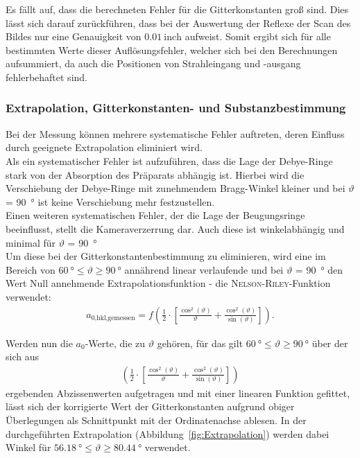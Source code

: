 \documentclass[a4paper,twoside,final]{article}
\begin{document}
Es fällt auf, dass die berechneten Fehler für die Gitterkonstanten groß sind. Dies lässt sich darauf zurückführen, dass bei der Auswertung der Reflexe der Scan des Bildes nur eine Genauigkeit von $\SI{0,01}{\text{inch}}$ aufweist. Somit ergibt sich für alle bestimmten Werte dieser Auflösungsfehler, welcher sich bei den Berechnungen aufsummiert, da auch die Positionen von Strahleingang und -ausgang fehlerbehaftet sind.
\subsubsection{Extrapolation, Gitterkonstanten- und Substanzbestimmung}
Bei der Messung können mehrere systematische Fehler auftreten, deren Einfluss durch geeignete Extrapolation eliminiert wird.\\ Als ein systematischer Fehler ist aufzuführen, dass die Lage der Debye-Ringe stark von der Absorption des Präparats abhängig ist. Hierbei wird die Verschiebung der Debye-Ringe mit zunehmendem Bragg-Winkel kleiner und bei $\vartheta$ = \SI{90}{\degree} ist keine Verschiebung mehr festzustellen. \\
Einen weiteren systematischen Fehler, der die Lage der Beugungsringe beeinflusst, stellt die Kameraverzerrung dar. Auch diese ist winkelabhängig und minimal für $\vartheta$ = \SI{90}{\degree}\\
Um diese bei der Gitterkonstantenbestimmung zu eliminieren, wird eine im Bereich von $\SI{60}{\degree} \leq \vartheta \geq \SI{90}{\degree}$ annährend linear verlaufende und bei $\vartheta$ = \SI{90}{\degree} den Wert Null annehmende Extrapolationsfunktion - die \textsc{Nelson-Riley}-Funktion verwendet:
\begin{align}
  a_\text{0,hkl,gemessen} = f\left(\frac{1}{2}\cdot\left[\frac{\cos^2(\vartheta)}{\vartheta}+\frac{\cos^2(\vartheta)}{\sin(\vartheta)}\right]\right).
\end{align}

Werden nun die $a_{0}$-Werte, die zu $\vartheta$ gehören, für das gilt $\SI{60}{\degree} \leq \vartheta \geq \SI{90}{\degree}$ über der sich aus
\begin{align}
  \left(\frac{1}{2}\cdot\left[\frac{\cos^2(\vartheta)}{\vartheta}+\frac{\cos^2(\vartheta)}{\sin(\vartheta)}\right]\right)\nonumber
\end{align}
ergebenden Abzissenwerten aufgetragen und mit einer linearen Funktion gefittet, lässt sich der korrigierte Wert der Gitterkonstanten aufgrund obiger Überlegungen als Schnittpunkt mit der Ordinatenachse ablesen. In der durchgeführten Extrapolation (Abbildung~\ref{fig:Extrapolation}) werden dabei Winkel für $\SI{56,18}{\degree} \leq \vartheta \geq \SI{80,44}{\degree}$ verwendet.
\end{document}
